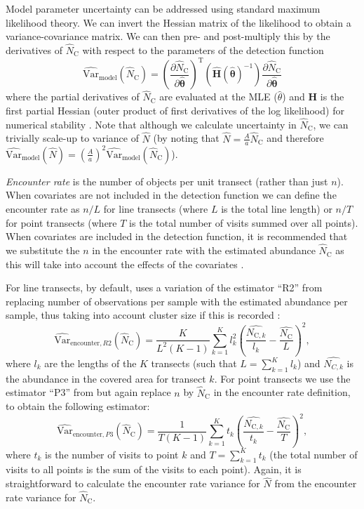 \documentclass[article,shortnames]{jss}
\begin{document}
Model parameter uncertainty can be addressed using standard maximum
likelihood theory. We can invert the Hessian matrix of the likelihood to
obtain a variance-covariance matrix. We can then pre- and post-multiply
this by the derivatives of \(\hat{N}_\text{C}\) with respect to the
parameters of the detection function \[
\widehat{\text{Var}}_\text{model}\left( \hat{N}_\text{C}\right) = \left(\frac{\partial \hat{N}_\text{C}}{\partial\hat{\boldsymbol{\theta}}}\right)^\text{T} \left(\hat{\mathbf{H}}(\hat{\boldsymbol{\theta}})^{-1} \right)\frac{\partial \hat{N}_\text{C}}{\partial\hat{\boldsymbol{\theta}}}
\] where the partial derivatives of \(\hat{N}_\text{C}\) are evaluated
at the MLE (\(\hat{\theta}\)) and \(\mathbf{H}\) is the first partial
Hessian (outer product of first derivatives of the log likelihood) for
numerical stability \citep[p 62]{Buckland:2001vm}. Note that although we
calculate uncertainty in \(\hat{N}_\text{C}\), we can trivially scale-up
to variance of \(\hat{N}\) (by noting that
\(\hat{N} = \frac{A}{a} \hat{N}_\text{C}\) and therefore
\(\widehat{\text{Var}}_\text{model}\left(\hat{N}\right) = \left( \frac{A}{a} \right)^2 \widehat{\text{Var}}_\text{model} \left(\hat{N}_\text{C} \right)\)).

\emph{Encounter rate} is the number of objects per unit transect (rather
than just \(n\)). When covariates are not included in the detection
function we can define the encounter rate as \(n/L\) for line transects
(where \(L\) is the total line length) or \(n/T\) for point transects
(where \(T\) is the total number of visits summed over all points). When
covariates are included in the detection function, it is recommended
that we substitute the \(n\) in the encounter rate with the estimated
abundance \(\hat{N}_\text{C}\) as this will take into account the
effects of the covariates \citep{Innes:2002ka}.

For line transects, by default,  uses a variation of the
estimator ``R2'' from \citet{Fewster:2009ku} replacing number of
observations per sample with the estimated abundance per sample, thus
taking into account cluster size if this is recorded
\citep{Innes:2002ka, Marques:2003vb}: \[
\widehat{\text{Var}}_{\text{encounter},R2}\left( \hat{N}_\text{C}\right) = \frac{K}{L^2(K-1)} \sum_{k=1}^{K} l_k^2 \left( \frac{\hat{N_{\text{C}, k}}}{l_k} - \frac{\hat{N_\text{C}}}{L}\right)^2,
\] where \(l_k\) are the lengths of the \(K\) transects (such that
\(L = \sum_{k=1}^K l_k\)) and \(\hat{N_{C,k}}\) is the abundance in the
covered area for transect \(k\). For point transects we use the
estimator ``P3'' from \citet{Fewster:2009ku} but again replace \(n\) by
\(\hat{N}_\text{C}\) in the encounter rate definition, to obtain the
following estimator: \[
\widehat{\text{Var}}_{\text{encounter},P3}\left( \hat{N}_\text{C}\right) = \frac{1}{T(K-1)} \sum_{k=1}^{K} t_k \left( \frac{\hat{N_{\text{C}, k}}}{t_k} - \frac{\hat{N_\text{C}}}{T}\right)^2,
\] where \(t_k\) is the number of visits to point \(k\) and
\(T = \sum_{k=1}^K t_k\) (the total number of visits to all points is
the sum of the visits to each point). Again, it is straightforward to
calculate the encounter rate variance for \(\hat{N}\) from the encounter
rate variance for \(\hat{N}_\text{C}\).
\end{document}
